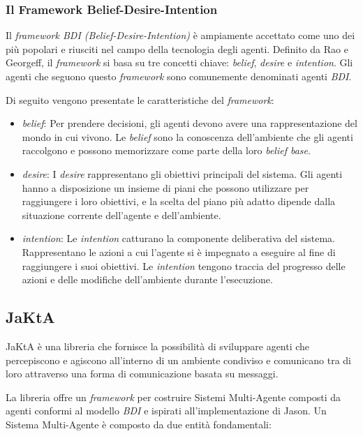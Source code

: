 \subsubsection{Il Framework Belief-Desire-Intention}
Il \textit{framework BDI (Belief-Desire-Intention)} è ampiamente accettato come uno dei più popolari e riusciti nel campo della tecnologia degli agenti. Definito da Rao e Georgeff, il \textit{framework} si basa su tre concetti chiave: \textit{belief}, \textit{desire} e \textit{intention}. Gli agenti che seguono questo \textit{framework} sono comunemente denominati agenti \textit{BDI}.

Di seguito vengono presentate le caratteristiche del \textit{framework}:

\begin{itemize}
    \item \textit{belief}: Per prendere decisioni, gli agenti devono avere una rappresentazione del mondo in cui vivono. Le \textit{belief} sono la conoscenza dell'ambiente che gli agenti raccolgono e possono memorizzare come parte della loro \textit{belief base}.
    \item \textit{desire}: I \textit{desire} rappresentano gli obiettivi principali del sistema. Gli agenti hanno a disposizione un insieme di piani che possono utilizzare per raggiungere i loro obiettivi, e la scelta del piano più adatto dipende dalla situazione corrente dell'agente e dell'ambiente.
    \item \textit{intention}: Le \textit{intention} catturano la componente deliberativa del sistema. Rappresentano le azioni a cui l'agente si è impegnato a eseguire al fine di raggiungere i suoi obiettivi. Le \textit{intention} tengono traccia del progresso delle azioni e delle modifiche dell'ambiente durante l'esecuzione.
\end{itemize}

\subsection{JaKtA}
JaKtA\cite{10.1007/978-3-031-43264-4_4} è una libreria che fornisce la possibilità di sviluppare agenti che percepiscono e agiscono all'interno di un ambiente condiviso e comunicano tra di loro attraverso una forma di comunicazione basata su messaggi.

La libreria offre un \textit{framework} per costruire Sistemi Multi-Agente composti da agenti conformi al modello \textit{BDI} e ispirati all'implementazione di Jason\cite{Bordini2005}. Un Sistema Multi-Agente è composto da due entità fondamentali:

